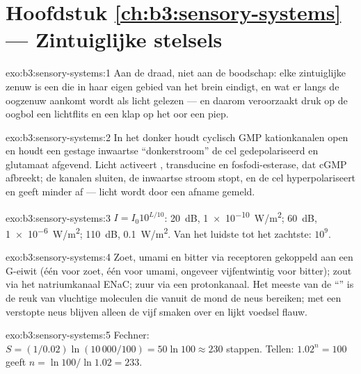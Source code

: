 \section*{Hoofdstuk \ref{ch:b3:sensory-systems} --- Zintuiglijke stelsels}

\begin{solution}{exo:b3:sensory-systems:1}
Aan de draad, niet aan de boodschap: elke zintuiglijke zenuw is een
 die in haar eigen gebied van het brein eindigt, en wat er
langs de oogzenuw aankomt wordt als licht gelezen --- en daarom
veroorzaakt druk op de oogbol een lichtflits en een klap op het oor een
piep.
\end{solution}

\begin{solution}{exo:b3:sensory-systems:2}
In het donker houdt cyclisch GMP kationkanalen open en houdt een
gestage inwaartse ``donkerstroom'' de cel gedepolariseerd en glutamaat
afgevend. Licht activeert , transducine en fosfodi-esterase,
dat cGMP afbreekt; de kanalen sluiten, de inwaartse stroom stopt, en de
cel hyperpolariseert en geeft minder af --- licht wordt door een afname
gemeld.
\end{solution}

\begin{solution}{exo:b3:sensory-systems:3}
$I = I_{0}10^{L/10}$: \qty{20}{dB}, \qty{1e-10}{W/m^2}; \qty{60}{dB},
\qty{1e-6}{W/m^2}; \qty{110}{dB}, \qty{0.1}{W/m^2}. Van het luidste tot
het zachtste: $10^{9}$.
\end{solution}

\begin{solution}{exo:b3:sensory-systems:4}
Zoet, umami en bitter via receptoren gekoppeld aan een G-eiwit (één
voor zoet, één voor umami, ongeveer vijfentwintig voor bitter); zout
via het natriumkanaal ENaC; zuur via een protonkanaal. Het meeste van
de ``'' is de reuk van vluchtige moleculen die vanuit de mond de
neus bereiken; met een verstopte neus blijven alleen de vijf smaken
over en lijkt voedsel flauw.
\end{solution}

\begin{solution}{exo:b3:sensory-systems:5}
Fechner: $S = (1/0.02)\ln(10\,000/100) = 50\ln 100 \approx 230$
stappen. Tellen: $1.02^{n} = 100$ geeft $n = \ln 100/\ln 1.02 = 233$.
\end{solution}

